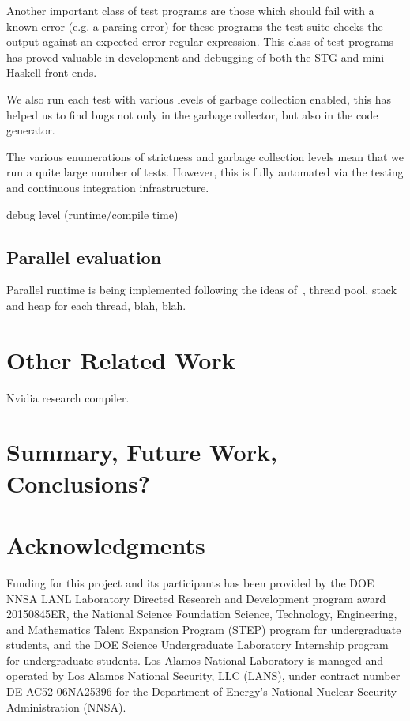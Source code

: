 \documentclass{llncs}
\begin{document}
Another important class of test programs are those which should fail with a
known error (e.g. a parsing error) for these programs the test suite checks
the output against an expected error regular expression. This class of test
programs has proved valuable in development and debugging of both the STG
and mini-Haskell front-ends.

We also run each test with various levels of garbage collection enabled, this
has helped us to find bugs not only in the garbage collector, but also in the
code generator.

The various enumerations of strictness and garbage collection levels mean that
we run a quite large number of tests. However, this is fully automated via the
testing and continuous integration infrastructure.

debug level (runtime/compile time)

\subsection{Parallel evaluation}

Parallel runtime is being implemented following the ideas
of~\cite{SPJs-many-papers}, thread pool, stack and heap for each thread, blah,
blah.

\section{Other Related Work}
Nvidia research compiler.

\section{Summary, Future Work, Conclusions?}

\section{Acknowledgments}

Funding for this project and its participants has been provided by the DOE
NNSA LANL Laboratory Directed Research and Development program award
20150845ER, the National Science Foundation Science, Technology, Engineering,
and Mathematics Talent Expansion Program (STEP) program for undergraduate
students, and the DOE Science Undergraduate Laboratory Internship program for
undergraduate students.
%
Los Alamos National Laboratory is managed and operated by Los Alamos National
Security, LLC (LANS), under contract number DE-AC52-06NA25396 for the
Department of Energy’s National Nuclear Security Administration (NNSA).

\cite{ghc-as-library}
\cite{Heren02}

%
%




\end{document}
